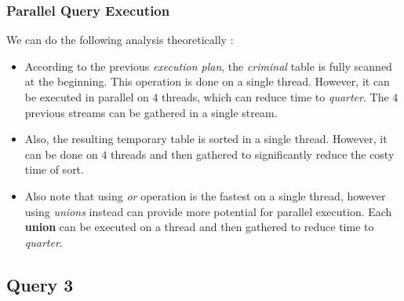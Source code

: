 \subsubsection{Parallel Query Execution}
We can do the following analysis theoretically :
\begin{itemize}
    \item According to the previous \emph{execution plan}, the \emph{criminal} table is fully scanned at the beginning. This operation is done on a single thread. However, it can be executed in parallel on $4$ threads, which can reduce time to \emph{quarter}. The $4$ previous streams can be gathered in a single stream.
    \item Also, the resulting temporary table is sorted in a single thread. However, it can be done on $4$ threads and then gathered to significantly reduce the costy time of sort.
    \item Also note that using \emph{or} operation is the fastest on a single thread, however using 
    \emph{unions} instead can provide more potential for parallel execution. Each \textbf{union} can be executed on a thread and then gathered to reduce time to \emph{quarter}.
\end{itemize}

\subsection{Query 3}


